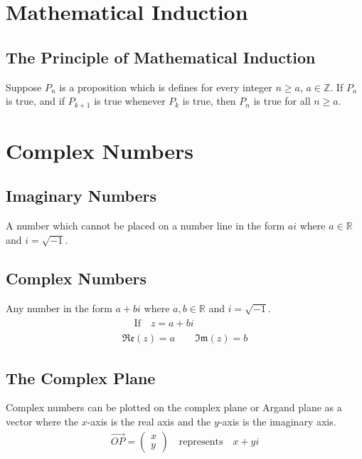 \documentclass[10pt, a4paper, titlepage]{article}
\begin{document}
\begin{multicols*}{3}
	\hrulefill


\section{Mathematical Induction}
	\subsection{The Principle of Mathematical Induction}
	Suppose $P_n$ is a proposition which is defines for every integer $n\geq a$, $a\in \mathbb{Z}$. If $P_a$ is true, and if $P_{k+1}$ is true whenever $P_k$ is true, then $P_n$ is true for all $n\geq a$.

	\hrulefill

\section{Complex Numbers}
	\subsection{Imaginary Numbers}
	A number which cannot be placed on a number line in the form $ai$ where $a\in \mathbb{R}$ and $i=\sqrt{-1}$.\\

	\dotfill
	\subsection{Complex Numbers}
	Any number in the form $a+bi$ where $a,b\in \mathbb{R}$ and $i=\sqrt{-1}$.
	\begin{gather}
		\begin{flalign}
			&\text{If}\quad z=a+bi&&
		\end{flalign}\\
		\mathfrak{Re} (z)=a\qquad \mathfrak{Im} (z)=b
	\end{gather}

	\dotfill
	\subsection{The Complex Plane}
	Complex numbers can be plotted on the complex plane or Argand plane as a vector where the $x$-axis is the real axis and the $y$-axis is the imaginary axis.
	\begin{align}
		\overrightarrow{OP}=\begin{pmatrix}x\\ y\end{pmatrix}\quad \text{represents}\quad x+yi
	\end{align}
	\dotfill

\end{multicols*}
\end{document}
